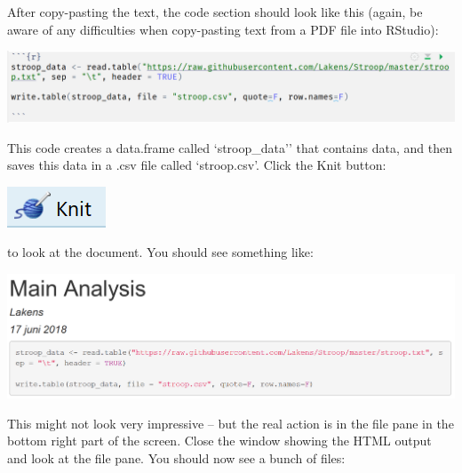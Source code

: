 \documentclass[
  oneside]{book}
\begin{document}
After copy-pasting the text, the code section should look like this (again, be
aware of any difficulties when copy-pasting text from a PDF file into RStudio):

\begin{center}\includegraphics[width=1\linewidth]{images/6d87836ecdcc9b06891059acc43930a2} \end{center}

This code creates a data.frame called `stroop\_data'' that contains data, and then
saves this data in a .csv file called `stroop.csv'. Click the Knit button:

\begin{center}\includegraphics[width=0.2\linewidth]{images/270645a5be86fa1d9d534f78b8ca0724} \end{center}

to look at the document. You should see something like:

\begin{center}\includegraphics[width=1\linewidth]{images/5bad7d8cde23291c2d67ff65897d60c4} \end{center}

This might not look very impressive -- but the real action is in the file pane in
the bottom right part of the screen. Close the window showing the HTML output
and look at the file pane. You should now see a bunch of files:
\end{document}
